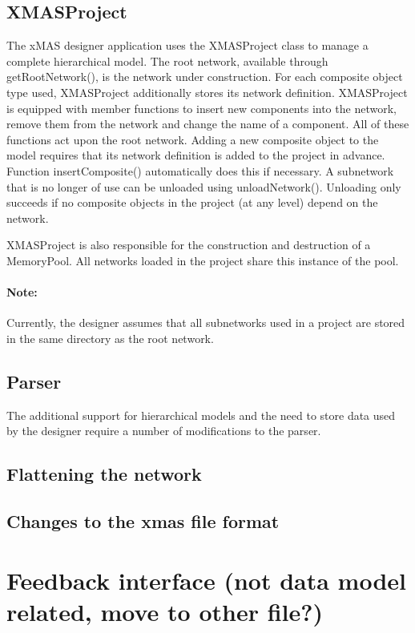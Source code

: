 \subsection{XMASProject}

The xMAS designer application uses the XMASProject class to manage a complete
hierarchical model. The root network, available through getRootNetwork(), is
the network under construction. For each composite object type used, XMASProject
additionally stores its network definition. XMASProject is equipped with member
functions to insert new components into the network, remove them from the network
and change the name of a component. All of these functions act upon the root network.
Adding a new composite object to the model requires that its network definition
is added to the project in advance. Function insertComposite() automatically does
this if necessary. A subnetwork that is no longer of use can be unloaded using
unloadNetwork(). Unloading only succeeds if no composite objects in the project
(at any level) depend on the network.

XMASProject is also responsible for the construction and destruction of a MemoryPool.
All networks loaded in the project share this instance of the pool.

\paragraph{Note:}
Currently, the designer assumes that all subnetworks used in a project are
stored in the same directory as the root network.


\subsection{Parser}

The additional support for hierarchical models and the need to store data used
by the designer require a number of modifications to the parser.


\subsection{Flattening the network}

\subsection{Changes to the xmas file format}

\section{Feedback interface (not data model related, move to other file?)}

\newpage

